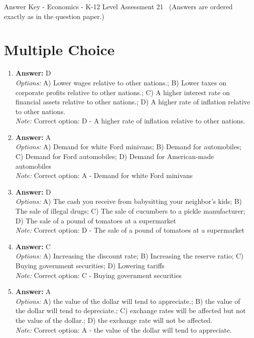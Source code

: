 \documentclass[12pt]{article}
\begin{document}
\begin{center}
Answer Key - Economics - K-12 Level Assessment 21 \
\small (Answers are ordered exactly as in the question paper.)
\end{center}

\section*{Multiple Choice}
\begin{enumerate}[label=\arabic*.]
\item \textbf{Answer:} D
\\ \textit{Options:} A) Lower wages relative to other nations.; B) Lower taxes on corporate profits relative to other nations.; C) A higher interest rate on financial assets relative to other nations.; D) A higher rate of inflation relative to other nations.
\\ \textit{Note:} Correct option: D - A higher rate of inflation relative to other nations.
\item \textbf{Answer:} A
\\ \textit{Options:} A) Demand for white Ford minivans; B) Demand for automobiles; C) Demand for Ford automobiles; D) Demand for American-made automobiles
\\ \textit{Note:} Correct option: A - Demand for white Ford minivans
\item \textbf{Answer:} D
\\ \textit{Options:} A) The cash you receive from babysitting your neighbor's kids; B) The sale of illegal drugs; C) The sale of cucumbers to a pickle manufacturer; D) The sale of a pound of tomatoes at a supermarket
\\ \textit{Note:} Correct option: D - The sale of a pound of tomatoes at a supermarket
\item \textbf{Answer:} C
\\ \textit{Options:} A) Increasing the discount rate; B) Increasing the reserve ratio; C) Buying government securities; D) Lowering tariffs
\\ \textit{Note:} Correct option: C - Buying government securities
\item \textbf{Answer:} A
\\ \textit{Options:} A) the value of the dollar will tend to appreciate.; B) the value of the dollar will tend to depreciate.; C) exchange rates will be affected but not the value of the dollar.; D) the exchange rate will not be affected.
\\ \textit{Note:} Correct option: A - the value of the dollar will tend to appreciate.
\end{enumerate}
\end{document}
